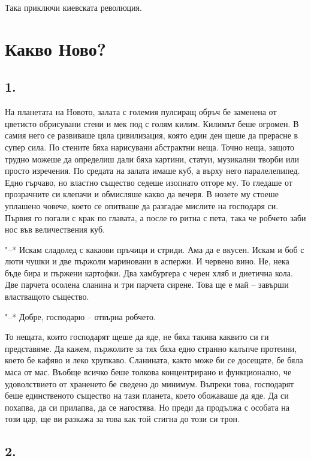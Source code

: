 \documentclass[ebook,openany,12pt]{memoir}
\begin{document}
Така приключи киевската революция.

\chapter{Какво Ново?}

\section*{1.}

На планетата на Новото, залата с големия пулсиращ обръч бе заменена от цветисто обрисувани стени и мек под с голям килим. Килимът беше огромен. В самия него се развиваше цяла цивилизация, която един ден щеше да прерасне в супер сила. По стените бяха нарисувани абстрактни неща. Точно неща, защото трудно можеше да определиш дали бяха картини, статуи, музикални творби или просто изречения. По средата на залата имаше куб, а върху него паралелепипед. Едно гърчаво, но властно същество седеше изопнато отгоре му. То гледаше от прозрачните си клепачи и обмисляше какво да вечеря. В нозете му стоеше уплашено човече, което се опитваше да разгадае мислите на господаря си. Първия го погали с крак по главата, а после го ритна с пета, така че робчето заби нос във величествения куб.

"--* Искам сладолед с какаови пръчици и стриди. Ама да е вкусен. Искам и боб с люти чушки и две пържоли мариновани в аспержи. И червено вино. Не, нека бъде бира и пържени картофки. Два хамбургера с черен хляб и диетична кола. Две парчета осолена сланина и три парчета сирене. Това ще е май – завърши властващото същество.

"--* Добре, господарю – отвърна робчето.

То нещата, които господарят щеше да яде, не бяха такива каквито си ги представяме. Да кажем, пържолите за тях бяха едно странно калъпче протеини, което бе кафяво и леко хрупкаво. Сланината, както може би се досещате, бе бяла маса от мас. Въобще всичко беше толкова концентрирано и функционално, че удоволствието от храненето бе сведено до минимум. Въпреки това, господарят беше единственото същество на тази планета, което обожаваше да яде. Да си похапва, да си прилапва, да се нагостява. Но преди да продължа с особата на този цар, ще ви разкажа за това как той стигна до този си трон.

\section*{2.}
\end{document}
